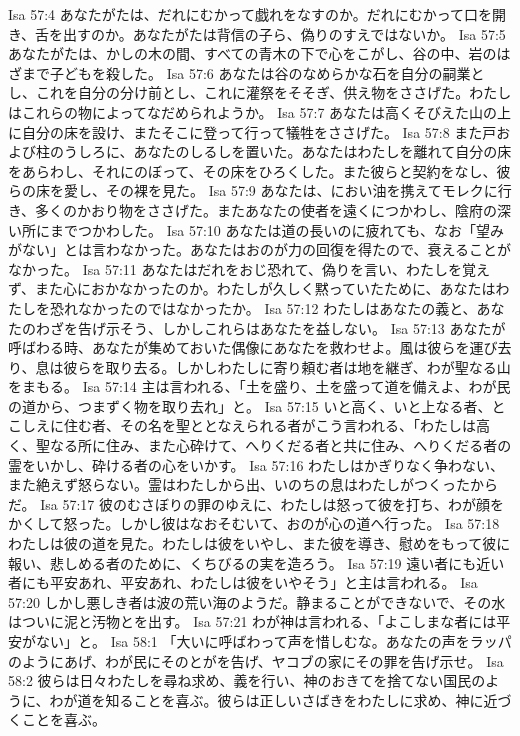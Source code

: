 Isa 57:4  あなたがたは、だれにむかって戯れをなすのか。だれにむかって口を開き、舌を出すのか。あなたがたは背信の子ら、偽りのすえではないか。
Isa 57:5  あなたがたは、かしの木の間、すべての青木の下で心をこがし、谷の中、岩のはざまで子どもを殺した。
Isa 57:6  あなたは谷のなめらかな石を自分の嗣業とし、これを自分の分け前とし、これに灌祭をそそぎ、供え物をささげた。わたしはこれらの物によってなだめられようか。
Isa 57:7  あなたは高くそびえた山の上に自分の床を設け、またそこに登って行って犠牲をささげた。
Isa 57:8  また戸および柱のうしろに、あなたのしるしを置いた。あなたはわたしを離れて自分の床をあらわし、それにのぼって、その床をひろくした。また彼らと契約をなし、彼らの床を愛し、その裸を見た。
Isa 57:9  あなたは、におい油を携えてモレクに行き、多くのかおり物をささげた。またあなたの使者を遠くにつかわし、陰府の深い所にまでつかわした。
Isa 57:10  あなたは道の長いのに疲れても、なお「望みがない」とは言わなかった。あなたはおのが力の回復を得たので、衰えることがなかった。
Isa 57:11  あなたはだれをおじ恐れて、偽りを言い、わたしを覚えず、また心におかなかったのか。わたしが久しく黙っていたために、あなたはわたしを恐れなかったのではなかったか。
Isa 57:12  わたしはあなたの義と、あなたのわざを告げ示そう、しかしこれらはあなたを益しない。
Isa 57:13  あなたが呼ばわる時、あなたが集めておいた偶像にあなたを救わせよ。風は彼らを運び去り、息は彼らを取り去る。しかしわたしに寄り頼む者は地を継ぎ、わが聖なる山をまもる。
Isa 57:14  主は言われる、「土を盛り、土を盛って道を備えよ、わが民の道から、つまずく物を取り去れ」と。
Isa 57:15  いと高く、いと上なる者、とこしえに住む者、その名を聖ととなえられる者がこう言われる、「わたしは高く、聖なる所に住み、また心砕けて、へりくだる者と共に住み、へりくだる者の霊をいかし、砕ける者の心をいかす。
Isa 57:16  わたしはかぎりなく争わない、また絶えず怒らない。霊はわたしから出、いのちの息はわたしがつくったからだ。
Isa 57:17  彼のむさぼりの罪のゆえに、わたしは怒って彼を打ち、わが顔をかくして怒った。しかし彼はなおそむいて、おのが心の道へ行った。
Isa 57:18  わたしは彼の道を見た。わたしは彼をいやし、また彼を導き、慰めをもって彼に報い、悲しめる者のために、くちびるの実を造ろう。
Isa 57:19  遠い者にも近い者にも平安あれ、平安あれ、わたしは彼をいやそう」と主は言われる。
Isa 57:20  しかし悪しき者は波の荒い海のようだ。静まることができないで、その水はついに泥と汚物とを出す。
Isa 57:21  わが神は言われる、「よこしまな者には平安がない」と。
Isa 58:1  「大いに呼ばわって声を惜しむな。あなたの声をラッパのようにあげ、わが民にそのとがを告げ、ヤコブの家にその罪を告げ示せ。
Isa 58:2  彼らは日々わたしを尋ね求め、義を行い、神のおきてを捨てない国民のように、わが道を知ることを喜ぶ。彼らは正しいさばきをわたしに求め、神に近づくことを喜ぶ。

